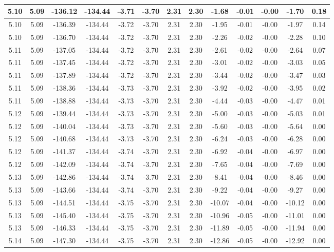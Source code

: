 \begin{table}[htbp]
\begin{adjustbox}{angle=90}
\begin{tabular}{|c|c|c|c|c|c|c|c|c|c|c|c|c|}
 5.10 & 5.09 & -136.12 & -134.44 & -3.71 & -3.70 & 2.31 & 2.30 & -1.68 & -0.01 & -0.00 & -1.70 & 0.18\\ \hline
 5.10 & 5.09 & -136.39 & -134.44 & -3.72 & -3.70 & 2.31 & 2.30 & -1.95 & -0.01 & -0.00 & -1.97 & 0.14\\ \hline
 5.10 & 5.09 & -136.70 & -134.44 & -3.72 & -3.70 & 2.31 & 2.30 & -2.26 & -0.02 & -0.00 & -2.28 & 0.10\\ \hline
 5.11 & 5.09 & -137.05 & -134.44 & -3.72 & -3.70 & 2.31 & 2.30 & -2.61 & -0.02 & -0.00 & -2.64 & 0.07\\ \hline
 5.11 & 5.09 & -137.45 & -134.44 & -3.72 & -3.70 & 2.31 & 2.30 & -3.01 & -0.02 & -0.00 & -3.03 & 0.05\\ \hline
 5.11 & 5.09 & -137.89 & -134.44 & -3.72 & -3.70 & 2.31 & 2.30 & -3.44 & -0.02 & -0.00 & -3.47 & 0.03\\ \hline
 5.11 & 5.09 & -138.36 & -134.44 & -3.73 & -3.70 & 2.31 & 2.30 & -3.92 & -0.02 & -0.00 & -3.95 & 0.02\\ \hline
 5.11 & 5.09 & -138.88 & -134.44 & -3.73 & -3.70 & 2.31 & 2.30 & -4.44 & -0.03 & -0.00 & -4.47 & 0.01\\ \hline
 5.12 & 5.09 & -139.44 & -134.44 & -3.73 & -3.70 & 2.31 & 2.30 & -5.00 & -0.03 & -0.00 & -5.03 & 0.01\\ \hline
 5.12 & 5.09 & -140.04 & -134.44 & -3.73 & -3.70 & 2.31 & 2.30 & -5.60 & -0.03 & -0.00 & -5.64 & 0.00\\ \hline
 5.12 & 5.09 & -140.68 & -134.44 & -3.73 & -3.70 & 2.31 & 2.30 & -6.24 & -0.03 & -0.00 & -6.28 & 0.00\\ \hline
 5.12 & 5.09 & -141.37 & -134.44 & -3.74 & -3.70 & 2.31 & 2.30 & -6.92 & -0.04 & -0.00 & -6.97 & 0.00\\ \hline
 5.12 & 5.09 & -142.09 & -134.44 & -3.74 & -3.70 & 2.31 & 2.30 & -7.65 & -0.04 & -0.00 & -7.69 & 0.00\\ \hline
 5.13 & 5.09 & -142.86 & -134.44 & -3.74 & -3.70 & 2.31 & 2.30 & -8.41 & -0.04 & -0.00 & -8.46 & 0.00\\ \hline
 5.13 & 5.09 & -143.66 & -134.44 & -3.74 & -3.70 & 2.31 & 2.30 & -9.22 & -0.04 & -0.00 & -9.27 & 0.00\\ \hline
 5.13 & 5.09 & -144.51 & -134.44 & -3.75 & -3.70 & 2.31 & 2.30 & -10.07 & -0.04 & -0.00 & -10.12 & 0.00\\ \hline
 5.13 & 5.09 & -145.40 & -134.44 & -3.75 & -3.70 & 2.31 & 2.30 & -10.96 & -0.05 & -0.00 & -11.01 & 0.00\\ \hline
 5.13 & 5.09 & -146.33 & -134.44 & -3.75 & -3.70 & 2.31 & 2.30 & -11.89 & -0.05 & -0.00 & -11.94 & 0.00\\ \hline
 5.14 & 5.09 & -147.30 & -134.44 & -3.75 & -3.70 & 2.31 & 2.30 & -12.86 & -0.05 & -0.00 & -12.92 & 0.00\\ \hline
            \end{tabular}
        \end{adjustbox}
        \caption{}
        \label{}
    \end{table}
    